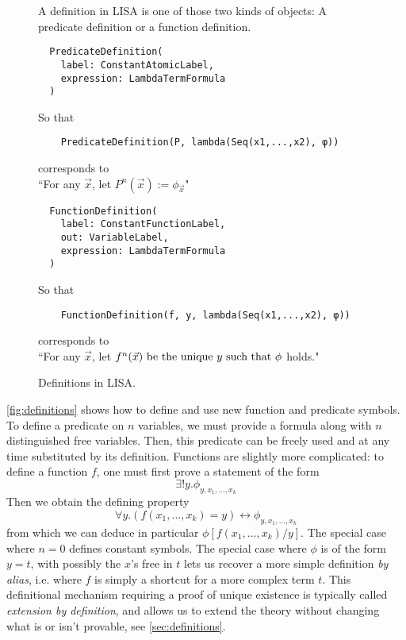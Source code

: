 \begin{figure}
  A definition in LISA is one of those two kinds of objects: A predicate definition or a function definition.
  \begin{lstlisting}
  PredicateDefinition(
    label: ConstantAtomicLabel,
    expression: LambdaTermFormula
  )
\end{lstlisting}
  So that
  \begin{lstlisting}
    PredicateDefinition(P, lambda(Seq(x1,...,x2), φ)) 
  \end{lstlisting}
  corresponds to \\
  \hspace*{1.3em}``For any $\vec{x}$, let $P^n(\vec{x}) := \phi_{\vec{x}}$"

  \vspace*{2em}
  \begin{lstlisting}
  FunctionDefinition(
    label: ConstantFunctionLabel,
    out: VariableLabel, 
    expression: LambdaTermFormula
  )
\end{lstlisting}
  So that
  \begin{lstlisting}
    FunctionDefinition(f, y, lambda(Seq(x1,...,x2), φ)) 
  \end{lstlisting}
  corresponds to \\
  \hspace*{1.3em}``For any $\vec{x}$, let $f^n(\vec{x}) \textnormal{ be the unique } y \textnormal{ such that } \phi$ holds."

  \caption{Definitions in LISA.}
  \label{fig:definitions}
\end{figure}

\autoref{fig:definitions} shows how to define and use new function and predicate symbols. To define a predicate on $n$ variables, we must provide a formula along with $n$ distinguished free variables. Then, this predicate can be freely used and at any time substituted by its definition. Functions are slightly more complicated: to define a function $f$, one must first prove a statement of the form
$$\exists ! y. \phi_{y, x_1,...,x_k}$$
Then we obtain the defining property
$$\forall y. (f(x_1,...,x_k)=y) \leftrightarrow \phi_{y, x_1,...,x_k}$$
from which we can deduce in particular $\phi[f(x_1,...,x_k)/y]$.
The special case where $n=0$ defines constant symbols. The special case where $\phi$ is of the form $y=t$, with possibly the $x$'s free in $t$ lets us recover a more simple definition \textit{by alias}, i.e. where  $f$ is simply a shortcut for a more complex term $t$.
This definitional mechanism requiring a proof of unique existence is typically called \textit{extension by definition}, and allows us to extend the theory without changing what is or isn't provable, see \autoref{sec:definitions}.

